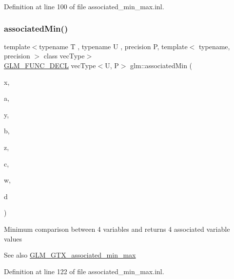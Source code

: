 Definition at line 100 of file associated\+\_\+min\+\_\+max.\+inl.

\mbox{\label{group__gtx__associated__min__max_ga0f63b0dce5a5c3242cc6d9847e7d14f1}} 
\subsubsection{\texorpdfstring{associatedMin()}{associatedMin()}\hspace{0.1cm}{\footnotesize\ttfamily [9/10]}}
{\footnotesize\ttfamily template$<$typename T , typename U , precision P, template$<$ typename, precision $>$ class vec\+Type$>$ \\
\mbox{\hyperlink{setup_8hpp_ab2d052de21a70539923e9bcbf6e83a51}{G\+L\+M\+\_\+\+F\+U\+N\+C\+\_\+\+D\+E\+CL}} vec\+Type$<$U, P$>$ glm\+::associated\+Min (\begin{DoxyParamCaption}\item[{T}]{x,  }\item[{vec\+Type$<$ U, P $>$ const \&}]{a,  }\item[{T}]{y,  }\item[{vec\+Type$<$ U, P $>$ const \&}]{b,  }\item[{T}]{z,  }\item[{vec\+Type$<$ U, P $>$ const \&}]{c,  }\item[{T}]{w,  }\item[{vec\+Type$<$ U, P $>$ const \&}]{d }\end{DoxyParamCaption})}

Minimum comparison between 4 variables and returns 4 associated variable values \begin{DoxySeeAlso}{See also}
\mbox{\hyperlink{group__gtx__associated__min__max}{G\+L\+M\+\_\+\+G\+T\+X\+\_\+associated\+\_\+min\+\_\+max}} 
\end{DoxySeeAlso}


Definition at line 122 of file associated\+\_\+min\+\_\+max.\+inl.

\mbox{\label{group__gtx__associated__min__max_ga00a949fd345f4b31b259f033d3ab4a1c}} 
